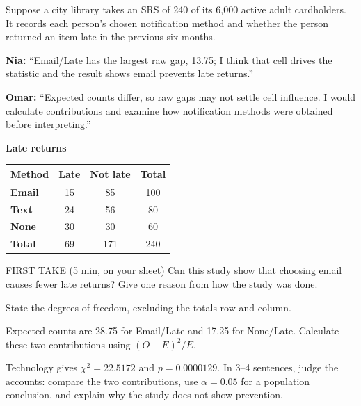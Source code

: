 \documentclass[14pt]{extarticle}
\begin{document}
\pagestyle{empty}


\noindent\begin{minipage}[t]{0.57\linewidth}
\vspace{0pt}
Suppose a city library takes an SRS of 240 of its 6,000 active adult cardholders. It records each person's chosen notification method and whether the person returned an item late in the previous six months.\par\smallskip \textbf{Nia:} ``Email/Late has the largest raw gap, 13.75; I think that cell drives the statistic and the result shows email prevents late returns.''\par \textbf{Omar:} ``Expected counts differ, so raw gaps may not settle cell influence. I would calculate contributions and examine how notification methods were obtained before interpreting.''\par
\end{minipage}\hfill
\begin{minipage}[t]{0.40\linewidth}
\vspace{0pt}
\begin{center}
\textbf{Late returns}\par\smallskip
\begin{tabular}{|l|c|c|c|}
\hline
\textbf{Method} & \textbf{Late} & \textbf{Not late} & \textbf{Total} \\ \hline
\textbf{Email} & 15 & 85 & 100 \\ \hline
\textbf{Text} & 24 & 56 & 80 \\ \hline
\textbf{None} & 30 & 30 & 60 \\ \hline
\textbf{Total} & 69 & 171 & 240 \\ \hline
\end{tabular}
\end{center}
\end{minipage}

\begin{firsttakebox}{FIRST TAKE (5 min, on your sheet)}
Can this study show that choosing email causes fewer late returns? Give one reason from how the study was done.
\end{firsttakebox}

\begin{description}[leftmargin=1.15in, labelwidth=1in, itemsep=2pt, topsep=2pt]
  \item[\dokbadge{1}~(a)] State the degrees of freedom, excluding the totals row and column.
  \item[\dokbadge{2}~(b)] Expected counts are 28.75 for Email/Late and 17.25 for None/Late. Calculate these two contributions using $(O-E)^2/E$.
  \item[\dokbadge{3}~(c)] Technology gives $\chi^2=22.5172$ and $p=0.0000129$. In 3--4 sentences, judge the accounts: compare the two contributions, use $\alpha=0.05$ for a population conclusion, and explain why the study does not show prevention.
\end{description}
\end{document}
